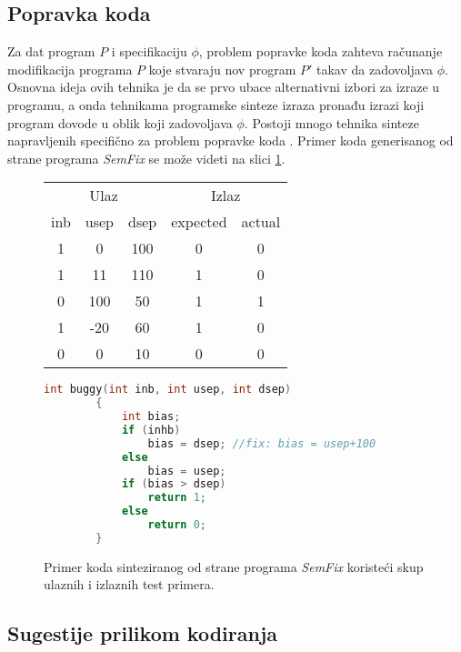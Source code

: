 \subsection{Popravka koda}
\label{subsec:PopravkaKoda}

Za dat program $P$ i specifikaciju $\phi$, problem popravke koda zahteva ra\-ču\-na\-nje modifikacija programa $P$ koje stvaraju nov program $P'$ takav da zadovoljava $\phi$. Osnovna ideja ovih tehnika je da se prvo ubace alternativni izbori za izraze u programu, a onda tehnikama programske sinteze izraza pronađu izrazi koji program dovode u oblik koji zadovoljava $\phi$. Postoji mnogo tehnika sinteze napravljenih specifično za problem popravke koda \cite{Qlose, ProgramRepairAsAGame}. Primer koda generisanog od strane programa \emph{SemFix} \cite{SemFix} se može videti na slici \ref{fig:CodeRepair}.

\begin{figure}[t]
    \centering
    \begin{tabular}{ccc|cc}
        \multicolumn{3}{c|}{Ulaz} & \multicolumn{2}{c}{Izlaz}\\
        inb & usep & dsep & expected & actual \\
        \hline
        1 & 0 & 100 & 0 & 0 \\
        1 & 11 & 110 & 1 & 0 \\
        0 & 100 & 50 & 1 & 1 \\
        1 & -20 & 60 & 1 & 0 \\
        0 & 0 & 10 & 0 & 0 \\
    \end{tabular}

    \centering
    \begin{lstlisting}[language=C]
        int buggy(int inb, int usep, int dsep)
        {
            int bias;
            if (inhb)
                bias = dsep; //fix: bias = usep+100
            else
                bias = usep;
            if (bias > dsep)
                return 1;
            else
                return 0;
        }
    \end{lstlisting}

    \caption{Primer koda sinteziranog od strane programa \emph{SemFix} \cite{SemFix} koristeći skup ulaznih i izlaznih test primera.}
    \label{fig:CodeRepair}
\end{figure}

\subsection{Sugestije prilikom kodiranja}
\label{subsec:SugestijePrilikomKodiranja}

